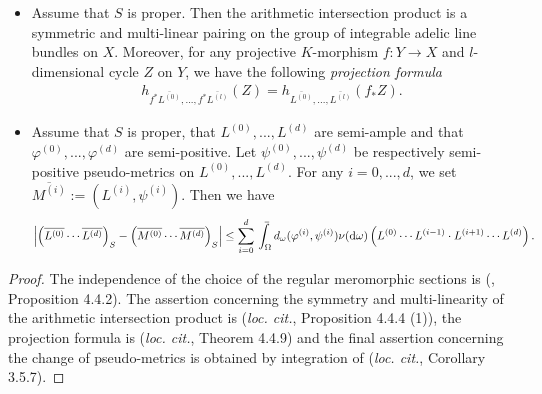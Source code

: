 \documentclass [11pt,reqno]{amsart}
\newcommand{\1}{\mathmybb{1}}
\def\diff{\mathrm{d}}
\def\upint{\mathchoice%
    {\mkern13mu\overline{\vphantom{\intop}\mkern7mu}\mkern-20mu}%
    {\mkern7mu\overline{\vphantom{\intop}\mkern7mu}\mkern-14mu}%
    {\mkern7mu\overline{\vphantom{\intop}\mkern7mu}\mkern-14mu}%
    {\mkern7mu\overline{\vphantom{\intop}\mkern7mu}\mkern-14mu}%
  \int}
\begin{document}
\begin{theorem-definition}
\begin{itemize}
	\item[(4)] Assume that $S$ is proper. Then the arithmetic intersection product is a symmetric and multi-linear pairing on the group of integrable adelic line bundles on $X$. Moreover, for any projective $K$-morphism $f:Y\to X$ and $l$-dimensional cycle $Z$ on $Y$, we have the following \emph{projection formula}
	\begin{align*}
	h_{f^{\ast}\overline{L^{(0)}},...,f^{\ast}\overline{L^{(l)}}}(Z) = h_{\overline{L^{(0)}},...,\overline{L^{(l)}}}(f_{\ast}Z).
	\end{align*}
	\item[(5)] Assume that $S$ is proper, that $L^{(0)},...,L^{(d)}$ are semi-ample and that $\varphi^{(0)},...,\varphi^{(d)}$ are semi-positive. Let $\psi^{(0)},...,\psi^{(d)}$ be respectively semi-positive pseudo-metrics on $L^{(0)},...,L^{(d)}$. For any $i=0,...,d$, we set $\overline{M^{(i)}}:=(L^{(i)},\psi^{(i)})$. Then we have
	\begin{align*}
	\left|\left(\overline{L^{(0)}}\cdots\overline{L^{(d)}}\right)_{S} - \left(\overline{M^{(0)}}\cdots\overline{M^{(d)}}\right)_{S}\right| \leq \displaystyle\sum_{i=0}^{d} \upint_{\Omega}d_{\omega}(\varphi^{(i)},\psi^{(i)})\nu(\diff\omega)\left(L^{(0)}\cdots L^{(i-1)}\cdot L^{(i+1)}\cdots L^{(d)}\right).
	\end{align*}
\end{itemize}
\end{theorem-definition}

\begin{proof}
The independence of the choice of the regular meromorphic sections is (\cite{ChenMori21}, Proposition 4.4.2). The assertion concerning the symmetry and multi-linearity of the arithmetic intersection product is (\emph{loc. cit.}, Proposition 4.4.4 (1)), the projection formula is (\emph{loc. cit.}, Theorem 4.4.9) and the final assertion concerning the change of pseudo-metrics is obtained by integration of (\emph{loc. cit.}, Corollary 3.5.7).
\end{proof}
\end{document}
